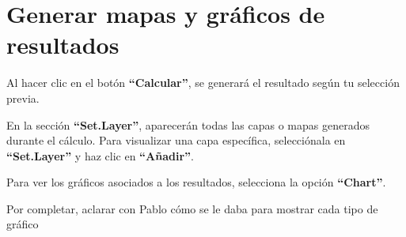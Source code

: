 \documentclass[
]{book}
\begin{document}
\chapter{Generar mapas y gráficos de resultados}\label{mapas-graficos}

Al hacer clic en el botón \textbf{``Calcular''}, se generará el resultado según tu selección previa.

En la sección \textbf{``Set.Layer''}, aparecerán todas las capas o mapas generados durante el cálculo. Para visualizar una capa específica, selecciónala en \textbf{``Set.Layer''} y haz clic en \textbf{``Añadir''}.

Para ver los gráficos asociados a los resultados, selecciona la opción \textbf{``Chart''}.

Por completar, aclarar con Pablo cómo se le daba para mostrar cada tipo de gráfico

  
\end{document}
